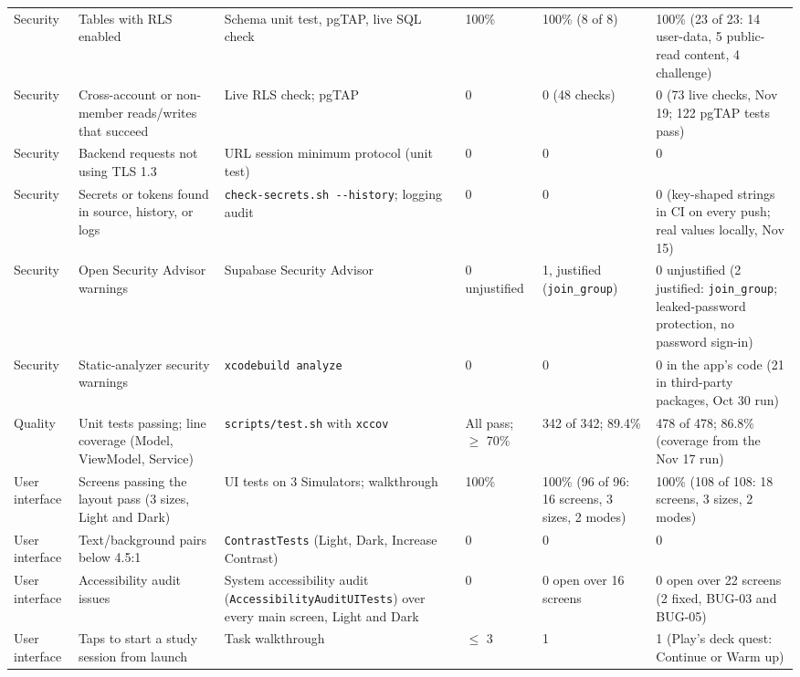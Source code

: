\documentclass[12pt,letterpaper]{article}
\begin{document}
\begin{xltabular}{\textwidth}{@{}L{1.8cm} L{3.0cm} Y L{1.6cm} L{2.0cm} L{2.2cm}@{}}
Security & Tables with RLS enabled & Schema unit test, pgTAP, live SQL check & 100\% & 100\% (8 of 8) & 100\% (23 of 23: 14 user-data, 5 public-read content, 4 challenge) \\
Security & Cross-account or non-member reads/writes that succeed & Live RLS check; pgTAP & 0 & 0 (48 checks) & 0 (73 live checks, Nov 19; 122 pgTAP tests pass) \\
Security & Backend requests not using TLS 1.3 & URL session minimum protocol (unit test) & 0 & 0 & 0 \\
Security & Secrets or tokens found in source, history, or logs & \texttt{check-secrets.sh -{}-history}; logging audit & 0 & 0 & 0 (key-shaped strings in CI on every push; real values locally, Nov 15) \\
Security & Open Security Advisor warnings & Supabase Security Advisor & 0 unjustified & 1, justified (\texttt{join\_group}) & 0 unjustified (2 justified: \texttt{join\_group}; leaked-password protection, no password sign-in) \\
Security & Static-analyzer security warnings & \texttt{xcodebuild analyze} & 0 & 0 & 0 in the app's code (21 in third-party packages, Oct 30 run) \\
Quality & Unit tests passing; line coverage (Model, ViewModel, Service) & \texttt{scripts/test.sh} with \texttt{xccov} & All pass; $\ge$ 70\% & 342 of 342; 89.4\% & 478 of 478; 86.8\% (coverage from the Nov 17 run) \\
User interface & Screens passing the layout pass (3 sizes, Light and Dark) & UI tests on 3 Simulators; walkthrough & 100\% & 100\% (96 of 96: 16 screens, 3 sizes, 2 modes) & 100\% (108 of 108: 18 screens, 3 sizes, 2 modes) \\
User interface & Text/background pairs below 4.5:1 & \texttt{ContrastTests} (Light, Dark, Increase Contrast) & 0 & 0 & 0 \\
User interface & Accessibility audit issues & System accessibility audit (\texttt{AccessibilityAuditUITests}) over every main screen, Light and Dark & 0 & 0 open over 16 screens & 0 open over 22 screens (2 fixed, BUG-03 and BUG-05) \\
User interface & Taps to start a study session from launch & Task walkthrough & $\le$ 3 & 1 & 1 (Play's deck quest: Continue or Warm up) \\
\end{xltabular}

\end{document}
